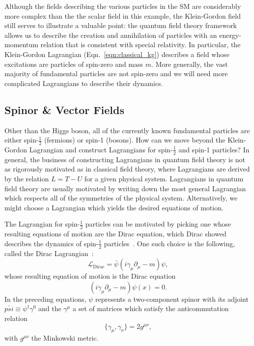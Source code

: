 Although the fields describing the various particles in the SM are considerably more complex than the the scalar field in this example, the Klein-Gordon field still serves to illustrate a valuable point: the quantum field theory framework allows us to describe the creation and annihilation of particles with an energy-momentum relation that is consistent with special relativity.
In particular, the Klein-Gordon Lagrangian (Eqn.~\ref{eqn:classical_kg}) describes a field whose excitations are particles of spin-zero and mass $m$.
More generally, the vast majority of fundamental particles are not spin-zero and we will need more complicated Lagrangians to describe their dynamics.

\subsection{Spinor \& Vector Fields} \label{sec:theory_sv_fields}
Other than the Higgs boson, all of the currently known fundamental particles are either spin-$\frac{1}{2}$ (fermions) or spin-1 (bosons).
How can we move beyond the Klein-Gordon Lagrangian and construct Lagrangians for spin-$\frac{1}{2}$ and spin-1 particles?
In general, the business of constructing Lagrangians in quantum field theory is not as rigorously motivated as in classical field theory, where Lagrangians are derived by the relation $L = T - U$ for a given physical system.
Lagrangians in quantum field theory are usually motivated by writing down the most general Lagrangian which respects all of the symmetries of the physical system.
Alternatively, we might choose a Lagrangian which yields the desired equations of motion.

The Lagrangian for spin-$\frac{1}{2}$ particles can be motivated by picking one whose resulting equations of motion are the Dirac equation, which Dirac showed describes the dynamics of spin-$\frac{1}{2}$ particles~\cite{Dirac:1928hu}.
One such choice is the following, called the Dirac Lagrangian~\cite{Peskin:1995ev}:
\begin{equation} \label{eqn:dirac_lagrangian}
    \mathcal L_{\text{Dirac}} = \bar{\psi}(i \gamma_\mu \partial_\mu - m) \psi,
\end{equation}
whose resulting equation of motion is the Dirac equation
\begin{equation}
    (i \gamma_\mu \partial_\mu - m) \psi(x) = 0.
\end{equation}
In the preceding equations, $\psi$ represents a two-component spinor with its adjoint $\bar{psi} \equiv \psi^\dagger\gamma^0$ and the $\gamma^\mu$ a set of matrices which satisfy the anticommutation relation
\begin{equation}
    \{\gamma_\mu, \gamma_\nu\} = 2 g^{\mu\nu},
\end{equation}
with $g^{\mu\nu}$ the Minkowski metric. 


